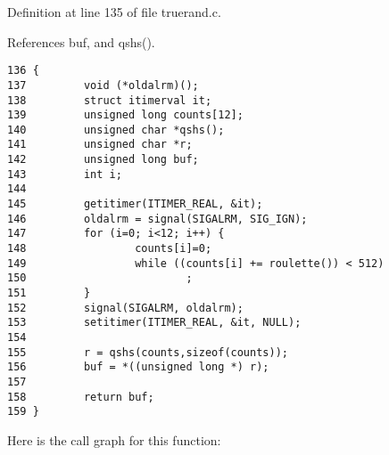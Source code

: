 Definition at line 135 of file truerand.c.

References buf, and qshs().



\footnotesize\begin{verbatim}136 {
137         void (*oldalrm)();
138         struct itimerval it;
139         unsigned long counts[12];
140         unsigned char *qshs();
141         unsigned char *r;
142         unsigned long buf;
143         int i;
144 
145         getitimer(ITIMER_REAL, &it);
146         oldalrm = signal(SIGALRM, SIG_IGN);
147         for (i=0; i<12; i++) {
148                 counts[i]=0;
149                 while ((counts[i] += roulette()) < 512)
150                         ;
151         }
152         signal(SIGALRM, oldalrm);
153         setitimer(ITIMER_REAL, &it, NULL);
154 
155         r = qshs(counts,sizeof(counts));
156         buf = *((unsigned long *) r);
157 
158         return buf;
159 }
\end{verbatim}\normalsize 


Here is the call graph for this function: